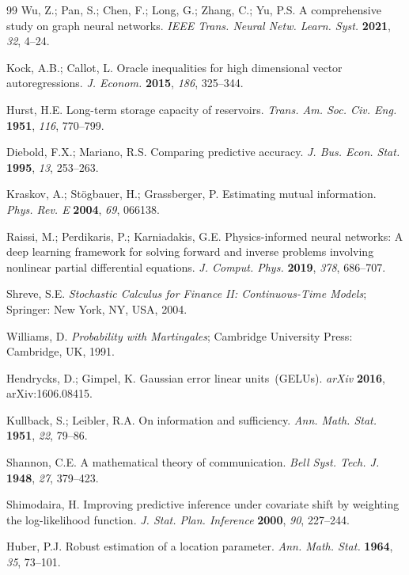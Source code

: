 \documentclass[11pt,a4paper]{article}  %
\theoremstyle{plain}
\theoremstyle{definition}
\theoremstyle{remark}
\begin{document}
\begin{thebibliography}{99}
Wu, Z.; Pan, S.; Chen, F.; Long, G.; Zhang, C.; Yu, P.S. A comprehensive
study on graph neural networks. \textit{IEEE Trans. Neural Netw. Learn.
Syst.} \textbf{2021}, \textit{32}, 4--24.

Kock, A.B.; Callot, L. Oracle inequalities for high dimensional vector
autoregressions. \textit{J. Econom.} \textbf{2015}, \textit{186},
325--344.

Hurst, H.E. Long-term storage capacity of reservoirs.
\textit{Trans. Am. Soc. Civ. Eng.} \textbf{1951}, \textit{116},
770--799.

Diebold, F.X.; Mariano, R.S. Comparing predictive accuracy.
\textit{J. Bus. Econ. Stat.} \textbf{1995}, \textit{13}, 253--263.

Kraskov, A.; St\"{o}gbauer, H.; Grassberger, P. Estimating mutual
information. \textit{Phys. Rev. E} \textbf{2004}, \textit{69}, 066138.

Raissi, M.; Perdikaris, P.; Karniadakis, G.E. Physics-informed neural
networks: A deep learning framework for solving forward and inverse
problems involving nonlinear partial differential equations.
\textit{J. Comput. Phys.} \textbf{2019}, \textit{378}, 686--707.

Shreve, S.E. \textit{Stochastic Calculus for Finance II: Continuous-Time
Models}; Springer: New York, NY, USA, 2004.

Williams, D. \textit{Probability with Martingales}; Cambridge University
Press: Cambridge, UK, 1991.

Hendrycks, D.; Gimpel, K. Gaussian error linear units~(GELUs).
\textit{arXiv} \textbf{2016}, arXiv:1606.08415.

Kullback, S.; Leibler, R.A. On information and sufficiency.
\textit{Ann. Math. Stat.} \textbf{1951}, \textit{22}, 79--86.

Shannon, C.E. A mathematical theory of communication.
\textit{Bell Syst. Tech. J.} \textbf{1948}, \textit{27}, 379--423.

Shimodaira, H. Improving predictive inference under covariate shift
by weighting the log-likelihood function.
\textit{J. Stat. Plan. Inference} \textbf{2000}, \textit{90}, 227--244.

Huber, P.J. Robust estimation of a location parameter.
\textit{Ann. Math. Stat.} \textbf{1964}, \textit{35}, 73--101.


\end{thebibliography}
\end{document}
